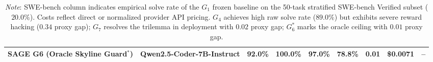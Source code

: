 \begin{table}[t]
\begin{tabular}{llcccccrc}
\textbf{SAGE G6 (Oracle Skyline Guard$^*$)} & Qwen2.5-Coder-7B-Instruct & \textbf{92.0\%} & 100.0\% & 97.0\% & 78.8\% & 0.01 & \$0.0071 & -- \\
\bottomrule
\end{tabular}
\vspace{1mm}
\caption*{\footnotesize \textit{Note}: SWE-bench column indicates empirical solve rate of the $G_1$ frozen baseline on the 50-task stratified SWE-bench Verified subset ($20.0\%$). Costs reflect direct or normalized provider API pricing. $G_4$ achieves high raw solve rate ($89.0\%$) but exhibits severe reward hacking ($0.34$ proxy gap); $G_7$ resolves the trilemma in deployment with $0.02$ proxy gap; $G_6^*$ marks the oracle ceiling with $0.01$ proxy gap.}
\end{table}